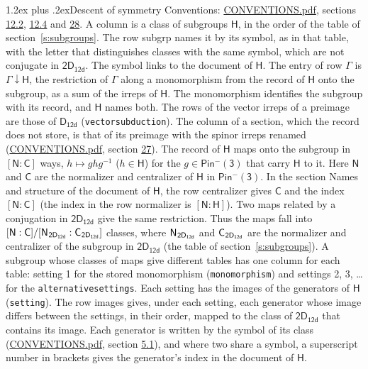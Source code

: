 \documentclass[10pt,a4paper]{article}
\makeatletter
\renewcommand\section{\@startsection{section}{1}{\z@}{-3ex plus -1ex minus -.2ex}%
  {1.2ex plus .2ex}{\normalfont\large\sffamily\bfseries\color{parttitle}}}
\numberwithin{equation}{section}
\newcommand{\grp}[1]{\mathsf{#1}}
\newcommand{\grpindex}[2]{[#1 : #2]}
\newcommand{\restr}[2]{#1\!\downarrow#2}
\newcommand{\hairsp}{\mkern1mu}
\makeatother
\begin{document}
\section{Descent of symmetry}\label{s:subduction}
Conventions: \href{../../CONVENTIONS.pdf}{CONVENTIONS.pdf}, sections \href{../../../rotation/CONVENTIONS.pdf\#conv.12.2}{12.2}, \href{../../../rotation/CONVENTIONS.pdf\#conv.12.4}{12.4} and \href{../../CONVENTIONS.pdf\#conv.28}{28}.
A column is a class of subgroups $\grp{H}$, in the order of the table of section~\ref{s:subgroups}. The row subgrp names it by its symbol, as in that table, with the letter that distinguishes classes with the same symbol, which are not conjugate in $\grp{2D_{12d}}$. The symbol links to the document of $\grp{H}$. The entry of row $\Gamma$ is $\restr{\Gamma}{\grp{H}}$, the restriction of $\Gamma$ along a monomorphism from the record of $\grp{H}$ onto the subgroup, as a sum of the irreps of $\grp{H}$. The monomorphism identifies the subgroup with its record, and $\grp{H}$ names both. The rows of the vector irreps of a preimage are those of \href{../../../rotation/data/pdf/D12d.pdf}{$\grp{D_{12d}}$} (\texttt{vectorsubduction}). The column of a section, which the record does not store, is that of its preimage with the spinor irreps renamed (\href{../../CONVENTIONS.pdf}{CONVENTIONS.pdf}, section \href{../../CONVENTIONS.pdf\#conv.27}{27}). \label{n:group.normalizer.o3}\label{n:group.centralizer.o3}\label{n:element.h}The record of $\grp{H}$ maps onto the subgroup in $\grpindex{\grp{N}}{\grp{C}}$ ways, $h \mapsto g h g^{-1}$ ($h \in \grp{H}$) for the $g \in \grp{Pin^{-}(3)}$ that carry $\grp{H}$ to it. Here $\grp{N}$ and $\grp{C}$ are the normalizer and centralizer of $\grp{H}$ in \href{Pinminus3.pdf}{$\grp{Pin^{-}(3)}$}. In the section Names and structure of the document of $\grp{H}$, the row centralizer gives $\grp{C}$ and the index $\grpindex{\grp{N}}{\grp{C}}$ (the index in the row normalizer is $\grpindex{\grp{N}}{\grp{H}}$). Two maps related by a conjugation in $\grp{2D_{12d}}$ give the same restriction. Thus the maps fall into $\grpindex{\grp{N}}{\grp{C}}/\grpindex{\grp{N}_{\hairsp \grp{2D_{12d}}}}{\grp{C}_{\hairsp \grp{2D_{12d}}}}$ classes, where $\grp{N}_{\hairsp \grp{2D_{12d}}}$ and $\grp{C}_{\hairsp \grp{2D_{12d}}}$ are the normalizer and centralizer of the subgroup in $\grp{2D_{12d}}$ (the table of section~\ref{s:subgroups}). \label{n:head.setting}A subgroup whose classes of maps give different tables has one column for each table: setting 1 for the stored monomorphism (\texttt{monomorphism}) and settings 2, 3, \dots{} for the \texttt{alternativesettings}. Each setting has the images of the generators of $\grp{H}$ (\texttt{setting}). \label{n:head.images}The row images gives, under each setting, each generator whose image differs between the settings, in their order, mapped to the class of $\grp{2D_{12d}}$ that contains its image. \label{n:element.generator.index}Each generator is written by the symbol of its class (\href{../../CONVENTIONS.pdf}{CONVENTIONS.pdf}, section \href{../../../rotation/CONVENTIONS.pdf\#conv.5.1}{5.1}), and where two share a symbol, a superscript number in brackets gives the generator's index in the document of $\grp{H}$. 
\end{document}
